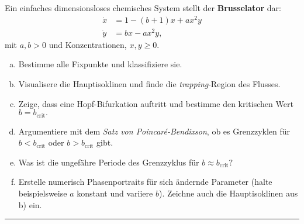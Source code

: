 \documentclass[11pt,a4paper]{article}
\begin{document}
\begin{aufg}
Ein einfaches dimensionsloses chemisches System stellt der \textbf{Brusselator} dar:
\begin{align*}
\dot{x} &= 1 - (b+1)x + ax^2y \\
\dot{y} &= bx - ax^2y,
\end{align*}
mit $a,b > 0$ und \glqq Konzentrationen\grqq, $x,y \geq 0.$
\begin{enumerate}[a)]
\item Bestimme alle Fixpunkte und klassifiziere sie.
\item Visualisere die Hauptisoklinen und finde die \emph{trapping}-Region des Flusses.
\item Zeige, dass eine Hopf-Bifurkation auftritt und bestimme den kritischen Wert $b = b_{\mathrm{crit}}.$
\item Argumentiere mit dem \emph{Satz von Poincar\'e-Bendixson}, ob es Grenzzyklen f\"ur $b < b_{\mathrm{crit}}$ oder $b > b_{\mathrm{crit}}$ gibt.
\item Was ist die ungef\"ahre Periode des Grenzzyklus f\"ur $b \approx b_{\mathrm{crit}}?$
\item Erstelle numerisch Phasenportraits f\"ur sich \"andernde Parameter (halte beispielsweise $a$ konstant und variiere $b$). Zeichne auch die Hauptisoklinen aus b) ein.
\end{enumerate}
\end{aufg}

\medskip
\hrule

\end{document}
